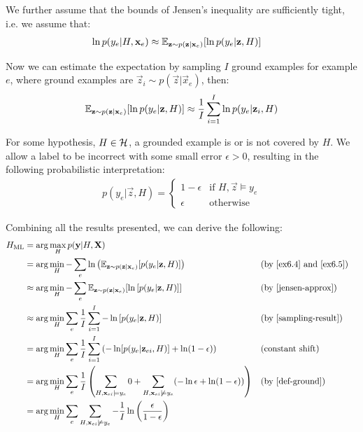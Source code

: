 We further assume that the bounds of Jensen's inequality are sufficiently tight, i.e. we assume that:
\begin{align}
\ln p(y_e|H, \textbf{x}_e)
&\approx \mathbb{E}_{\textbf{z} \sim p(\textbf{z}| \textbf{x}_e)}[\ln  p(y_e|\textbf{z},H)] \label{jensen-approx}
\end{align}

Now we can estimate the expectation by sampling $I$ ground examples for example $e$, where ground examples are $\vec{z}_{i} \sim p(\vec{z}| \vec{x}_e)$, then:
\begin{align}
\mathbb{E}_{\textbf{z} \sim p(\textbf{z}| \textbf{x}_e)}[\ln  p(y_e|\textbf{z},H)]
\approx \frac{1}{I} \sum_{i=1}^{I} \ln  p(y_e|\textbf{z}_i,H) \label{sampling-result}
\end{align}

For some hypothesis, $H\in \mathcal{H}$, a grounded example is or is not covered by $H$. We allow a label to be incorrect with some small error $\epsilon > 0$, resulting in the following probabilistic interpretation:
\begin{align}
p(y_e | \vec{z}, H) =
\begin{cases}
1 - \epsilon & \text{if } H, \vec{z} \models y_e \\
\epsilon & \text{otherwise}
\label{def-ground}
\end{cases}
\end{align}

Combining all the results presented, we can derive the following:
\begin{align}
H_{\text{ML}} 
& = \arg\max_{H}
p(\textbf{y}|H, \textbf{X}) \nonumber \\
& = \arg\min_{H} 
-\sum_e \ln \left( \mathbb{E}_{\textbf{z} \sim p(\textbf{z}| \textbf{x}_e)}[p(y_e|\textbf{z},H)] \right ) 
&& \text{(by \ref{ex6.4} and \ref{ex6.5})} \nonumber \\
& \approx \arg\min_{H}
-\sum_e \mathbb{E}_{\textbf{z} \sim p(\textbf{z}| \textbf{x}_e)}[\ln \left[ p(y_e|\textbf{z},H) \right ]]  
&& \text{(by \ref{jensen-approx})} \nonumber \\
& \approx \arg\min_{H}
\sum_e \frac{1}{I} \sum_{i=1}^I -\ln \left[ p(y_e|\textbf{z},H) \right ]
&& \text{(by \ref{sampling-result})} \nonumber \\
& = \arg\min_{H} \sum_e \frac{1}{I} \sum_{i=1}^I  \left(-\ln  [p(y_e|\textbf{z}_{ei},H)] + \ln (1-\epsilon) \right)
&& \text{(constant shift)} \nonumber \\
& = \arg\min_{H}
\sum_e \frac{1}{I} 
\left (
\sum_{H,\textbf{x}_{ei}\models y_e} 0
+
\sum_{H,\textbf{x}_{ei}\not\models y_e} (-\ln \epsilon + \ln (1 - \epsilon))
\right ) 
&& \text{(by \ref{def-ground})} \nonumber \\
& = \arg\min_{H}
\sum_e  
\sum_{H,\textbf{x}_{ei}\not\models y_e} -\frac{1}{I}\ln \left ( \frac{\epsilon}{1 - \epsilon} \right ) \label{eq-final-no-int}
\end{align}


